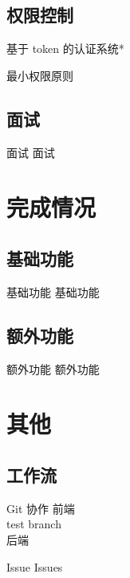 \documentclass[aspectratio=169,10pt]{beamer}
\begin{document}
\subsection{权限控制}
\begin{frame}{基于 token 的认证系统*}

\end{frame}

\begin{frame}{最小权限原则}

\end{frame}

\subsection{面试}
\begin{frame}{面试}
  面试
\end{frame}

\section{完成情况}

\subsection{基础功能}
\begin{frame}{基础功能}
  基础功能
\end{frame}

\subsection{额外功能}
\begin{frame}{额外功能}
  额外功能
\end{frame}

\section{其他}

\subsection{工作流}

\begin{frame}{Git 协作}
  前端 \\
  test branch \\
  后端
\end{frame}

\begin{frame}{Issue}
  Issues
\end{frame}
\end{document}
